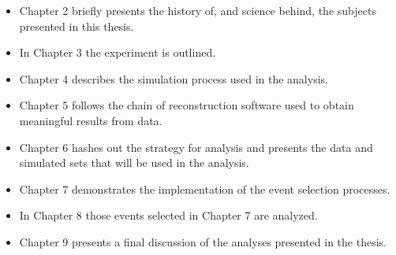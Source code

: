 \begin{itemize}


\item Chapter 2 briefly presents the history of, and science behind, the
subjects presented in this thesis.

\item In Chapter 3 the experiment is outlined.

\item Chapter 4 describes the simulation process used in the analysis.

\item Chapter 5 follows the chain of reconstruction software used to obtain
meaningful results from data.

\item Chapter 6 hashes out the strategy for analysis and presents the data and
simulated sets that will be used in the analysis.

\item Chapter 7 demonstrates the implementation of the event selection
processes.

\item In Chapter 8 those events selected in Chapter 7 are analyzed.

\item Chapter 9 presents a final discussion of the analyses presented in the
thesis.

\end{itemize}
